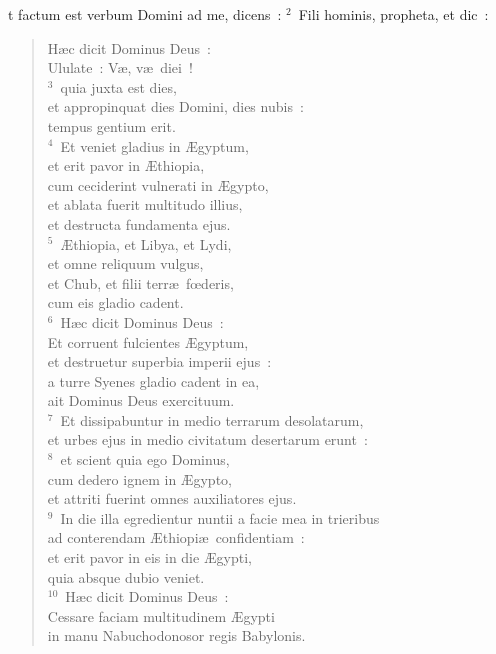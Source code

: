 \bchapter
{}t factum est verbum Domini ad me, dicens~:
${}^{2}$~Fili hominis, propheta, et dic~: \begin{flushleft}\begin{verse}H\ae c dicit Dominus Deus~:\\ Ululate~: V\ae , v\ae\ diei~!\\
${}^{3}$~quia juxta est dies,\\ et appropinquat dies Domini, dies nubis~:\\ tempus gentium erit.\\
${}^{4}$~Et veniet gladius in \AE gyptum,\\ et erit pavor in \AE thiopia,\\ cum ceciderint vulnerati in \AE gypto,\\ et ablata fuerit multitudo illius,\\ et destructa fundamenta ejus.\\
${}^{5}$~\AE thiopia, et Libya, et Lydi,\\ et omne reliquum vulgus,\\ et Chub, et filii terr\ae\ fœderis,\\ cum eis gladio cadent.\\
${}^{6}$~H\ae c dicit Dominus Deus~:\\ Et corruent fulcientes \AE gyptum,\\ et destruetur superbia imperii ejus~:\\ a turre Syenes gladio cadent in ea,\\ ait Dominus Deus exercituum.\\
${}^{7}$~Et dissipabuntur in medio terrarum desolatarum,\\ et urbes ejus in medio civitatum desertarum erunt~:\\
${}^{8}$~et scient quia ego Dominus,\\ cum dedero ignem in \AE gypto,\\ et attriti fuerint omnes auxiliatores ejus.\\
${}^{9}$~In die illa egredientur nuntii a facie mea in trieribus\\ ad conterendam \AE thiopi\ae\ confidentiam~:\\ et erit pavor in eis in die \AE gypti,\\ quia absque dubio veniet.\\
${}^{10}$~H\ae c dicit Dominus Deus~:\\ Cessare faciam multitudinem \AE gypti\\ in manu Nabuchodonosor regis Babylonis.\\

\end{verse}
\end{flushleft}
